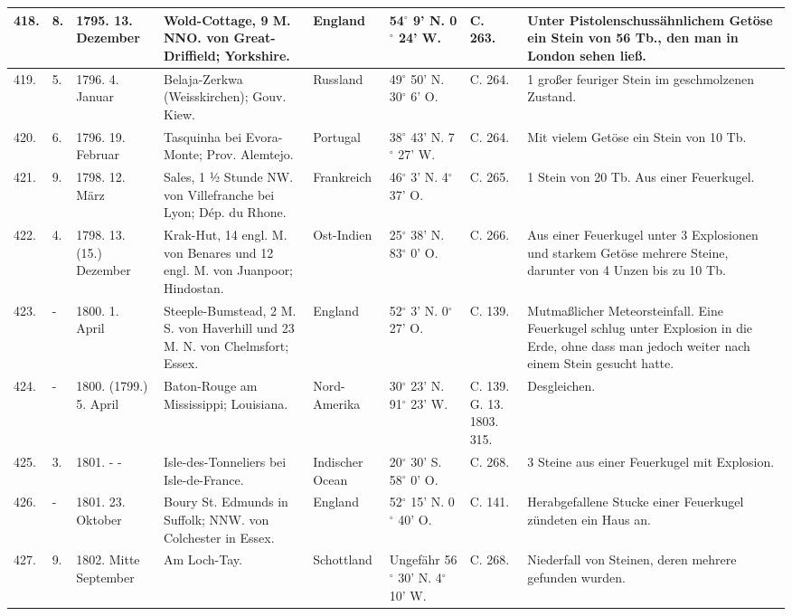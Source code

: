 \documentclass[a4paper, 11pt, oneside, polutonikogreek, german]{article}
\begin{document}
\begin{table}[!ht]
\begin{tabular}{|l|l|l|l|l|l|l|l|}
        418. & 8. & 1795. 13. Dezember & Wold-Cottage, 9 M. NNO. von Great-Driffield; Yorkshire. & England & 54$^\circ$ 9' N. 0$^\circ$ 24' W. & C. 263. & Unter Pistolenschussähnlichem Getöse ein Stein von 56 Tb., den man in London sehen ließ. \\ \hline
        419. & 5. & 1796. 4. Januar & Belaja-Zerkwa (Weisskirchen); Gouv. Kiew. & Russland & 49$^\circ$ 50' N. 30$^\circ$ 6' O. & C. 264. & 1 großer feuriger Stein im geschmolzenen Zustand. \\ \hline
        420. & 6. & 1796. 19. Februar & Tasquinha bei Evora-Monte; Prov. Alemtejo. & Portugal & 38$^\circ$ 43' N. 7$^\circ$ 27' W. & C. 264. & Mit vielem Getöse ein Stein von 10 Tb. \\ \hline
        421. & 9. & 1798. 12. März & Sales, 1 ½ Stunde NW. von Villefranche bei Lyon; Dép. du Rhone. & Frankreich & 46$^\circ$ 3' N. 4$^\circ$ 37' O. & C. 265. & 1 Stein von 20 Tb. Aus einer Feuerkugel. \\ \hline
        422. & 4. & 1798. 13. (15.) Dezember & Krak-Hut, 14 engl. M. von Benares und 12 engl. M. von Juanpoor; Hindostan. & Ost-Indien & 25$^\circ$ 38' N. 83$^\circ$ 0' O. & C. 266. & Aus einer Feuerkugel unter 3 Explosionen und starkem Getöse mehrere Steine, darunter von 4 Unzen bis zu 10 Tb. \\ \hline
        423. & - & 1800. 1. April & Steeple-Bumstead, 2 M. S. von Haverhill und 23 M. N. von Chelmsfort; Essex. & England & 52$^\circ$ 3' N. 0$^\circ$ 27' O. & C. 139. & Mutmaßlicher Meteorsteinfall. Eine Feuerkugel schlug unter Explosion in die Erde, ohne dass man jedoch weiter nach einem Stein gesucht hatte. \\ \hline
        424. & - & 1800. (1799.) 5. April & Baton-Rouge am Mississippi; Louisiana. & Nord-Amerika & 30$^\circ$ 23' N. 91$^\circ$ 23' W. & C. 139. G. 13. 1803. 315. & Desgleichen. \\ \hline
        425. & 3. & 1801. - - & Isle-des-Tonneliers bei Isle-de-France. & Indischer Ocean & 20$^\circ$ 30' S. 58$^\circ$ 0' O. & C. 268. & 3 Steine aus einer Feuerkugel mit Explosion. \\ \hline
        426. & - & 1801. 23. Oktober & Boury St. Edmunds in Suffolk; NNW. von Colchester in Essex. & England & 52$^\circ$ 15' N. 0$^\circ$ 40' O. & C. 141. & Herabgefallene Stucke einer Feuerkugel zündeten ein Haus an. \\ \hline
        427. & 9. & 1802. Mitte September & Am Loch-Tay. & Schottland & Ungefähr 56$^\circ$ 30' N. 4$^\circ$ 10' W. & C. 268. & Niederfall von Steinen, deren mehrere gefunden wurden. \\ \hline

\end{tabular}
\end{table}
\end{document}
